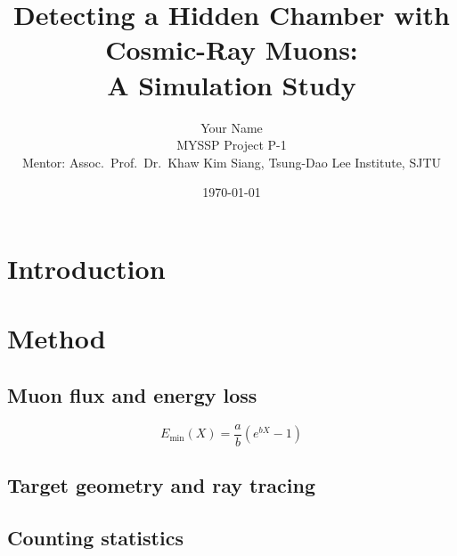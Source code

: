 \documentclass[11pt,a4paper]{article}
\title{Detecting a Hidden Chamber with Cosmic-Ray Muons:\\
       A Simulation Study}
\author{Your Name \\ \small MYSSP Project P-1 \\
        \small Mentor: Assoc.\ Prof.\ Dr.\ Khaw Kim Siang, Tsung-Dao Lee Institute, SJTU}
\date{\today}
\begin{document}
\maketitle

\begin{abstract}
\end{abstract}

\section{Introduction}

\section{Method}

\subsection{Muon flux and energy loss}
\begin{equation}
    E_{\min}(X) = \frac{a}{b}\left( e^{bX} - 1 \right)
\end{equation}

\subsection{Target geometry and ray tracing}

\subsection{Counting statistics}
\end{document}

